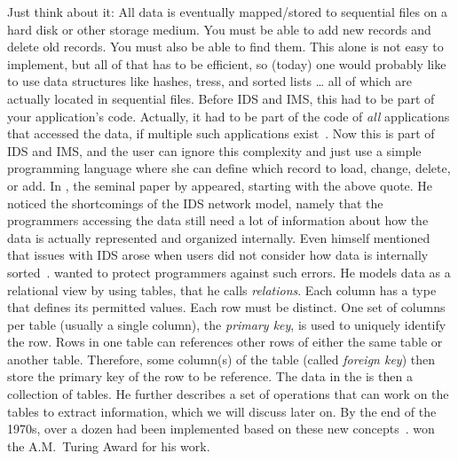 Just think about it:
All data is eventually mapped/stored to sequential files on a hard disk or other storage medium.
You must be able to add new records and delete old records.
You must also be able to find them.
This alone is not easy to implement, but all of that has to be efficient, so (today) one would probably like to use data structures like hashes, tress, and sorted lists {\dots} all of which are actually located in sequential files.
Before IDS and IMS, this had to be part of your application's code.
Actually, it had to be part of the code of \emph{all} applications that accessed the data, if multiple such applications exist~\cite{BBP2007TBOI}.
Now this is part of IDS and IMS, and the user can ignore this complexity and just use a simple programming language where she can define which record to load, change, delete, or add.%
%
%
%
In \citeyear{C1970ARMODFLSDB}, the seminal paper \emph{} by \citeauthor{C1970ARMODFLSDB} appeared, starting with the above quote.
He noticed the shortcomings of the IDS network model, namely that the programmers accessing the data still need a lot of information about how the data is actually represented and organized internally.
Even \citeauthor{B2009TOOTIDSITFDAD} himself mentioned that issues with IDS arose when users did not consider how data is internally sorted~\cite{B2009TOOTIDSITFDAD}.
 wanted to protect programmers against such errors.
He models data as a relational view by using tables, that he calls \emph{relations}.
Each column has a type that defines its permitted values.
Each row must be distinct.
One set of columns per table (usually a single column), the \emph{primary key}, is used to uniquely identify the row.
Rows in one table can references other rows of either the same table or another table.
Therefore, some column(s) of the table (called \emph{foreign key}) then store the primary key of the row to be reference.
The data in the  is then a collection of tables.
He further describes a set of operations that can work on the tables to extract information, which we will discuss later on.
By the end of the 1970s, over a dozen  had been implemented based on these new concepts~\cite{K1979RDS}.
 won the A.M.~Turing Award for his work.


